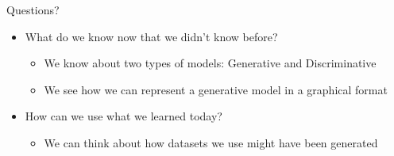 \documentclass[aspectratio=169]{beamer}
\begin{document}
\begin{frame}{Questions?}
\begin{itemize}
	\item What do we know now that we didn't know before?
\begin{itemize}
	\item We know about two types of models: Generative and Discriminative
	\item We see how we can represent a generative model in a graphical format
\end{itemize}

	\item How can we use what we learned today?
\begin{itemize}
	\item We can think about how datasets we use might have been generated
\end{itemize}
\end{itemize}
\end{frame}
\end{document}
